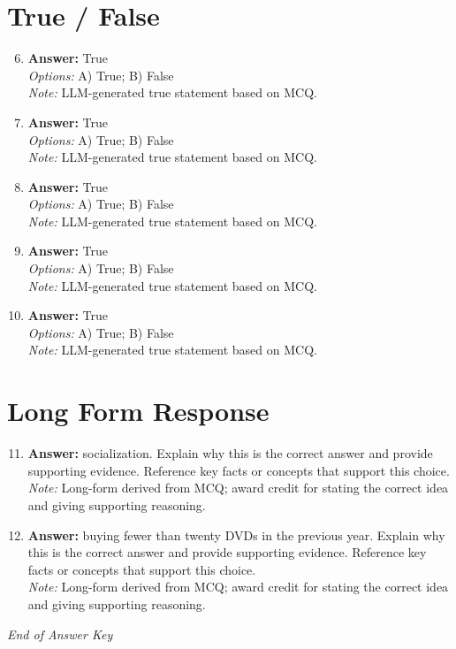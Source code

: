 \documentclass[12pt]{article}
\begin{document}
\section*{True / False}
\begin{enumerate}[label=\arabic*.]
\setcounter{enumi}{5}
\item \textbf{Answer:} True
\\ \textit{Options:} A) True; B) False
\\ \textit{Note:} LLM-generated true statement based on MCQ.
\item \textbf{Answer:} True
\\ \textit{Options:} A) True; B) False
\\ \textit{Note:} LLM-generated true statement based on MCQ.
\item \textbf{Answer:} True
\\ \textit{Options:} A) True; B) False
\\ \textit{Note:} LLM-generated true statement based on MCQ.
\item \textbf{Answer:} True
\\ \textit{Options:} A) True; B) False
\\ \textit{Note:} LLM-generated true statement based on MCQ.
\item \textbf{Answer:} True
\\ \textit{Options:} A) True; B) False
\\ \textit{Note:} LLM-generated true statement based on MCQ.
\end{enumerate}

\section*{Long Form Response}
\begin{enumerate}[label=\arabic*.]
\setcounter{enumi}{10}
\item \textbf{Answer:} socialization. Explain why this is the correct answer and provide supporting evidence. Reference key facts or concepts that support this choice.
\\ \textit{Note:} Long-form derived from MCQ; award credit for stating the correct idea and giving supporting reasoning.
\item \textbf{Answer:} buying fewer than twenty DVDs in the previous year. Explain why this is the correct answer and provide supporting evidence. Reference key facts or concepts that support this choice.
\\ \textit{Note:} Long-form derived from MCQ; award credit for stating the correct idea and giving supporting reasoning.
\end{enumerate}

\vfill
\noindent\textit{End of Answer Key}
\end{document}
